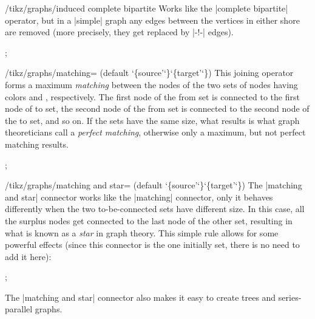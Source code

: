 \begin{key}{/tikz/graphs/induced complete bipartite}
    Works like the |complete bipartite| operator, but in a |simple| graph any
    edges between the vertices in either shore are removed (more precisely,
    they get replaced by |-!-| edges).
\begin{codeexample}[]
\tikz {};
\end{codeexample}
\end{key}

\begin{key}{/tikz/graphs/matching= (default \char`\{source'\char`\}\char`\{target'\char`\})}
    This joining operator forms a maximum \emph{matching} between the nodes of
    the two sets of nodes having colors  and ,
    respectively. The first node of the from set is connected to the first node
    of to set, the second node of the from set is connected to the second node
    of the to set, and so on. If the sets have the same size, what results is
    what graph theoreticians call a \emph{perfect matching}, otherwise only a
    maximum, but not perfect matching results.
\begin{codeexample}[]
\tikz {};
\end{codeexample}
\end{key}

\begin{key}{/tikz/graphs/matching and star= (default \char`\{source'\char`\}\char`\{target'\char`\})}
    The |matching and star| connector works like the |matching| connector, only
    it behaves differently when the two to-be-connected sets have different
    size. In this case, all the surplus nodes get connected to the last node of
    the other set, resulting in what is known as a \emph{star} in graph theory.
    This simple rule allows for some powerful effects (since this connector is
    the one initially set, there is no need to add it here):
\begin{codeexample}[]
\tikz {};
\end{codeexample}
    The |matching and star| connector also makes it easy to create trees and
    series-parallel graphs.
\end{key}

